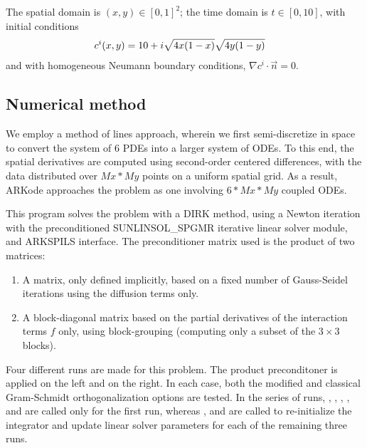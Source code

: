 \documentclass[letterpaper,10pt,english]{sphinxmanual}
\begin{document}
The spatial domain is \((x,y) \in [0, 1]^2\); the time domain is
\(t \in [0,10]\), with initial conditions
\begin{gather}
\begin{split}c^i(x,y) &=  10 + i \sqrt{4x(1-x)}\sqrt{4y(1-y)}\end{split}\notag
\end{gather}
and with homogeneous Neumann boundary conditions,
\(\nabla c^i \cdot \vec{n} = 0\).


\subsection{Numerical method}
\label{c_serial:id32}
We employ a method of lines approach, wherein we first semi-discretize
in space to convert the system of 6 PDEs into a larger system of ODEs.
To this end, the spatial derivatives are computed using second-order
centered differences, with the data distributed over \(Mx*My\)
points on a uniform spatial grid.  As a result, ARKode approaches the
problem as one involving \(6*Mx*My\) coupled ODEs.

This program solves the problem with a DIRK method, using a Newton
iteration with the preconditioned SUNLINSOL\_SPGMR iterative linear
solver module, and ARKSPILS interface.  The preconditioner matrix used
is the product of two matrices:
\begin{enumerate}
\item {} 
A matrix, only defined implicitly, based on a fixed number of
Gauss-Seidel iterations using the diffusion terms only.

\item {} 
A block-diagonal matrix based on the partial derivatives of the
interaction terms \(f\) only, using block-grouping (computing
only a subset of the \(3\times3\) blocks).

\end{enumerate}

Four different runs are made for this problem.  The product
preconditoner is applied on the left and on the right.  In each case,
both the modified and classical Gram-Schmidt orthogonalization options
are tested.  In the series of runs, , ,
, ,
 and  are called
only for the first run, whereas ,
 and  are called to
re-initialize the integrator and update linear solver parameters for
each of the remaining three runs.
\end{document}

